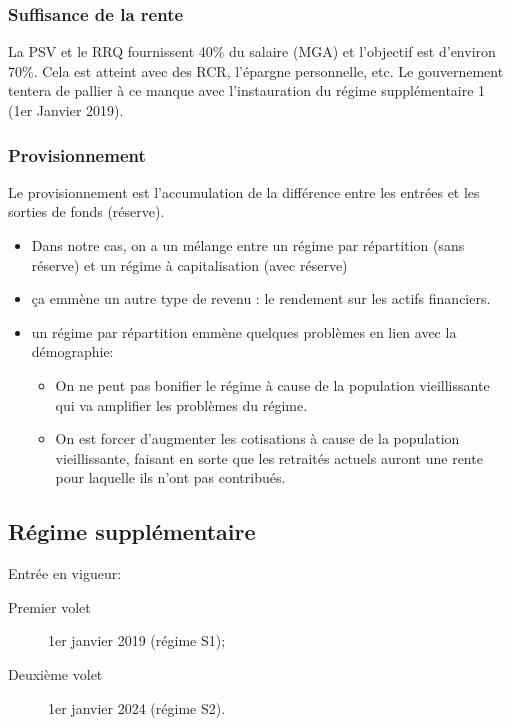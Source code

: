 \documentclass[10pt, french]{article}
\begin{document}
\begin{multicols*}{3}
\subsubsection*{Suffisance de la rente}
La PSV et le RRQ fournissent 40\% du salaire (MGA) et l'objectif est d'environ 70\%. Cela est atteint avec des RCR, l'épargne personnelle, etc. Le gouvernement tentera de pallier à ce manque avec l'instauration du régime supplémentaire 1 (1er Janvier 2019).

\subsubsection*{Provisionnement}

Le provisionnement est l'accumulation de la différence entre les entrées et les sorties de fonds (réserve).
\begin{itemize}
\item Dans notre cas, on a un mélange entre un régime par répartition (sans réserve) et un régime à capitalisation (avec réserve)
\item ça emmène un autre type de revenu : le rendement sur les actifs financiers.
\item un régime par répartition emmène quelques problèmes en lien avec la démographie: 
\begin{itemize}
\item On ne peut pas bonifier le régime à cause de la population vieillissante qui va amplifier les problèmes du régime.
\item On est forcer d'augmenter les cotisations à cause de la population vieillissante, faisant en sorte que les retraités actuels auront une rente pour laquelle ils n'ont pas contribués.
\end{itemize}
\end{itemize}


\columnbreak

\subsection*{Régime supplémentaire}
\begin{rappel_enhanced}[Historique]
Entrée en vigueur:
\begin{description}
	\item[Premier volet]	1er janvier 2019 (régime S1);
	\item[Deuxième volet]	1er janvier 2024	(régime S2).
\end{description}
\end{rappel_enhanced}


\end{multicols*}
\end{document}

